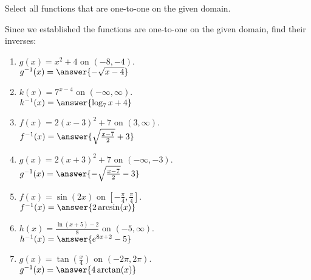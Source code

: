 \documentclass{ximera}
\author{Elizabeth Campolongo}
\begin{document}
\begin{exercise}
Select all functions that are one-to-one on the given domain.
%
\begin{selectAll}
\end{selectAll}

\begin{exercise}
Since we established the functions are one-to-one on the given domain, find their inverses:
\begin{enumerate}

\item $g(x) = x^2+4$ on $(-8,-4)$.\\
$g^{-1}(x) = \answer{-\sqrt{x-4}}$

\item $k(x) = 7^{x-4}$ on $(-\infty, \infty)$.\\
$k^{-1}(x) = \answer{\log_7x +4}$

\item $f(x) = 2(x-3)^2+7$ on $(3, \infty)$.\\
$f^{-1}(x) = \answer{\sqrt{\frac{x-7}{2}}+3}$

\item $g(x) = 2(x+3)^2+7$ on $(-\infty, -3)$.\\
$g^{-1}(x) = \answer{-\sqrt{\frac{x-7}{2}}-3}$

\item $f(x) = \sin(2x)$ on $\left[-\frac{\pi}{4}, \frac{\pi}{4} \right]$. \\
$f^{-1}(x) = \answer{2\arcsin(x)}$

\item $h(x) = \frac{\ln(x+5) - 2}{8}$ on $(-5,\infty)$. \\
$h^{-1}(x) = \answer{e^{8x+2}-5}$

\item $g(x)= \tan\left(\frac{x}{4}\right)$ on $(-2\pi,2\pi)$.\\
$g^{-1}(x) = \answer{4\arctan(x)}$

\end{enumerate}
\end{exercise}



\end{exercise}
\end{document}

